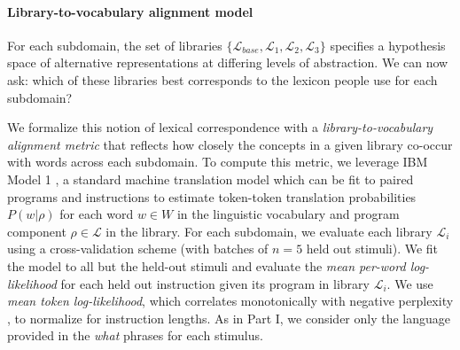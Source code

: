 \documentclass[10pt,letterpaper]{article}
\begin{document}


\paragraph{Library-to-vocabulary alignment model}
For each subdomain, the set of libraries $\{\mathcal{L}_{base}, \mathcal{L}_1, \mathcal{L}_2, \mathcal{L}_3\}$ specifies a hypothesis space of alternative representations at differing levels of abstraction. We can now ask: which of these libraries best corresponds to the lexicon people use for each subdomain?


We formalize this notion of lexical correspondence with a \textit{library-to-vocabulary alignment metric} that reflects how closely the concepts in a given library co-occur with words across each subdomain. 
To compute this metric, we leverage IBM Model 1 , a standard machine translation model which can be fit to paired programs and instructions to estimate token-token translation probabilities $P(w|\rho)$ for each word $w \in W$ in the linguistic vocabulary and program component $\rho \in \mathcal{L}$ in the library. 
For each subdomain, we evaluate each library $\mathcal{L}_i$ using a cross-validation scheme (with batches of $n=5$ held out stimuli). 
We fit the model to all but the held-out stimuli and evaluate the \textit{mean per-word log-likelihood} for each held out instruction given its program in library $\mathcal{L}_i$. 
We use \textit{mean token log-likelihood}, which correlates monotonically with negative {perplexity} , to normalize for instruction lengths. As in Part I, we consider only the language provided in the \textit{what} phrases for each stimulus.
\end{document}
